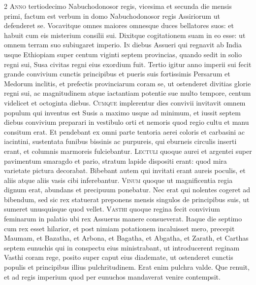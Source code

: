 \begin{multicols*}{2}
\lettrine[lines=2]{\zallmancaps \color{Red} A}{nno} tertiodecimo Nabuchodonosor regis, vicesima et secunda die mensis primi, factum est verbum in domo Nabuchodonosor regis Assiriorum ut defenderet se. Vocavitque omnes maiores omnesque duces bellatores suos: et habuit cum eis misterium consilii sui. Dixitque cogitationem suam in eo esse: ut omnem terram suo subiugaret imperio.
\lettrine[lines=2]{\zallmancaps \color{Blue} I}{n} diebus Assueri qui regnavit ab India usque Ethiopiam super centum viginti septem provincias, quando sedit in solio regni sui, Susa civitas regni eius exordium fuit. Tertio igitur anno imperii sui fecit grande convivium cunctis principibus et pueris suis fortissimis Persarum et Medorum inclitis, et prefectis provinciarum coram se, ut ostenderet divitias glorie regni sui, ac magnitudinem atque iactantiam potentie sue multo tempore, centum videlicet et octoginta diebus.
\lettrine[lines=2]{\zallmancaps \color{Red} C}{umque} implerentur dies convivii invitavit omnem populum qui inventus est Susis a maximo usque ad minimum, et iussit septem diebus convivium preparari in vestibulo orti et nemoris quod regio cultu et manu consitum erat. Et pendebant ex omni parte tentoria aerei coloris et carbasini ac iacintini, sustentata funibus bissinis ac purpureis, qui eburneis circulis inserti erant, et columnis marmoreis fulciebantur.
\lettrine[lines=2]{\zallmancaps \color{Blue} L}{ectuli} quoque aurei et argentei super pavimentum smaragdo et pario, stratum lapide dispositi erant: quod mira varietate pictura decorabat. Bibebant autem qui invitati erant aureis poculis, et aliis atque aliis vasis cibi inferebantur.
\lettrine[lines=2]{\zallmancaps \color{Red} V}{inum} quoque ut magnificentia regia dignum erat, abundans et precipuum ponebatur. Nec erat qui nolentes cogeret ad bibendum, sed sic rex statuerat preponens mensis singulos de principibus suis, ut sumeret unusquisque quod vellet.
\lettrine[lines=2]{\zallmancaps \color{Blue} V}{asthi} quoque regina fecit convivium feminarum in palatio ubi rex Assuerus manere consueverat. Itaque die septimo cum rex esset hilarior, et post nimiam potationem incaluisset mero, precepit Maumam, et Bazatha, et Arbona, et Bagatha, et Abgatha, et Zarath, et Carthas septem eunuchis qui in conspectu eius ministrabant, ut introducerent reginam Vasthi coram rege, posito super caput eius diademate, ut ostenderet cunctis populis et principibus illius pulchritudinem. Erat enim pulchra valde. Que renuit, et ad regis imperium quod per eunuchos mandaverat venire contempsit.

\end{multicols*}

